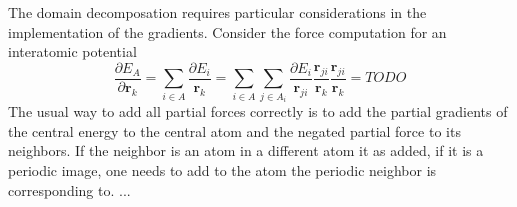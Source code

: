 The domain decomposation requires particular considerations in the implementation of the gradients.
Consider the force computation for an interatomic potential
\begin{equation}
  \frac{\partial E_A}{\partial\mathbf{r}_k} = \sum_{i\in A} \frac{\partial E_i}{\mathbf{r}_k} = \sum_{i\in A}\sum_{j\in A_i} \frac{\partial E_i}{\mathbf{r}_{ji}} \frac{\mathbf{r}_{ji}}{\mathbf{r}_k}
  \frac{\mathbf{r}_{ji}}{\mathbf{r}_k} =  TODO
\end{equation}
The usual way to add all partial forces correctly is to add the partial gradients of the central energy
to the central atom and the negated partial force to its neighbors.
If the neighbor is an atom in a different atom it as added, if it is a periodic image, one needs to add to the atom the periodic neighbor is corresponding to.
...




